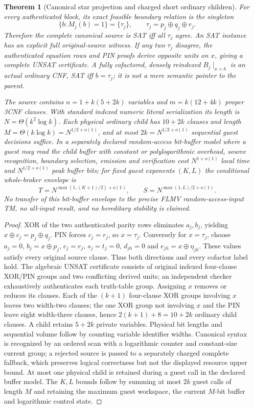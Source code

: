 \documentclass[11pt]{article}
\newtheorem{theorem}{Theorem}
\begin{document}
\begin{theorem}[Canonical star projection and charged short ordinary children]
For every authenticated block, its exact feasible boundary relation is the singleton
\[
\{b:M_j(b)=1\}=\{\tau_j\},\qquad \tau_j=p_j\oplus q_j\oplus r_j.
\]
Therefore the complete canonical source is SAT iff all $\tau_j$ agree. An SAT instance has an explicit full original-source witness. If any two $\tau_j$ disagree, the authenticated equation rows and PIN proofs derive opposite units on $x$, giving a complete UNSAT certificate. A fully cofactored, densely reindexed $B_j\mid_{x=b}$ is an actual ordinary CNF, SAT iff $b=\tau_j$; it is not a mere semantic pointer to the parent.

The source contains $n=1+k(5+2k)$ variables and $m=k(12+4k)$ proper 3CNF clauses. With standard indexed numeric literal serialization its length is $N=\Theta(k^2\log k)$. Each physical ordinary child has $10+2k$ clauses and length $M=\Theta(k\log k)=N^{1/2+o(1)}$, and at most $2k=N^{1/2+o(1)}$ sequential guest decisions suffice. In a \emph{separately declared} random-access bit-buffer model where a guest may read the child buffer with constant or polylogarithmic overhead, source recognition, boundary selection, emission and verification cost $N^{1+o(1)}$ local time and $N^{1/2+o(1)}$ peak buffer bits; for fixed guest exponents $(K,L)$ the conditional whole-broker envelope is
\[
 T= N^{\max(1,(K+1)/2)+o(1)},\qquad
 S= N^{\max(1,L)/2+o(1)}.
\]
No transfer of this bit-buffer envelope to the precise FLMV random-access-input TM, no all-input result, and no hereditary stability is claimed.
\end{theorem}
\begin{proof}
XOR of the two authenticated parity rows eliminates $a_j,b_j$, yielding $x\oplus c_j=p_j\oplus q_j$. PIN forces $c_j=r_j$, so $x=\tau_j$. Conversely for $x=\tau_j$, choose $a_j=0$, $b_j=x\oplus p_j$, $c_j=r_j$, $s_j=t_j=0$, $d_{jh}=0$ and $e_{jh}=x\oplus\eta_{jh}$. These values satisfy every original source clause. Thus both directions and every cofactor label hold. The algebraic UNSAT certificate consists of original indexed four-clause XOR/PIN groups and two conflicting derived units; an independent checker exhaustively authenticates each truth-table group. Assigning $x$ removes or reduces its clauses. Each of the $(k+1)$ four-clause XOR groups involving $x$ leaves two width-two clauses; the one XOR group not involving $x$ and the PIN leave eight width-three clauses, hence $2(k+1)+8=10+2k$ ordinary child clauses. A child retains $5+2k$ private variables. Physical bit lengths and sequential volume follow by counting variable identifier widths. Canonical syntax is recognized by an ordered scan with a logarithmic counter and constant-size current group; a rejected source is passed to a separately charged complete fallback, which preserves logical correctness but not the displayed resource upper bound. At most one physical child is retained during a guest call in the declared buffer model. The $K,L$ bounds follow by summing at most $2k$ guest calls of length $M$ and retaining the maximum guest workspace, the current $M$-bit buffer and logarithmic control state. \end{proof}
\end{document}
